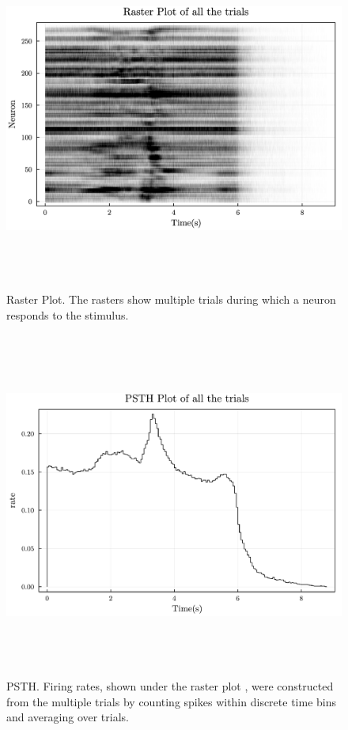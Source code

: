 \documentclass[9pt,twocolumn]{paper-template}
\begin{document}
\begin{figure}
\centering
\includegraphics[width=12cm,height=11.4cm]{TotRasterPlot.jpg}
\caption{Raster Plot. The rasters show multiple trials during which a neuron responds to the stimulus.}\label{fig:raster}
\end{figure}
\begin{figure}
\centering
\includegraphics[width=12cm,height=11.4cm]{TotPSTHPlot.pdf}
\caption{PSTH. Firing rates, shown under the raster plot , were constructed from the multiple trials by counting spikes within discrete time bins and averaging over trials.}\label{fig:psth}
\end{figure}
\end{document}
